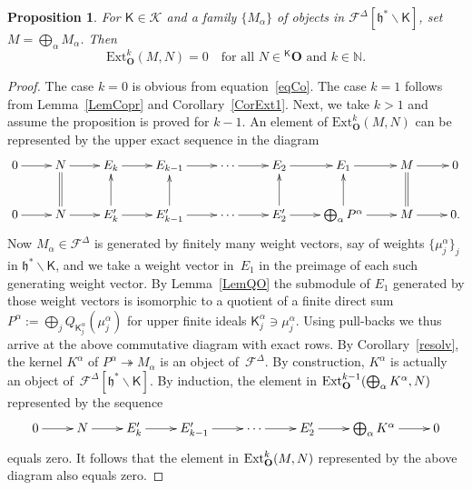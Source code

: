 \documentclass[11pt]{amsart}
\newcommand{\cK}{\mathcal{K}}
\newcommand{\KKK}{\mathsf{K}}
\newcommand{\cF}{{\mathcal{F}}}
\newcommand{\tto}{\twoheadrightarrow}
\newcommand{\bO}{\mathbf{O}}
\newcommand{\Hom}{\mathrm{Hom}}
\newcommand{\Ext}{\mathrm{Ext}}
\newcommand{\fg}{\mathfrak{g}}
\newcommand{\fh}{\mathfrak{h}}
\newcommand{\mN}{\mathbb{N}}
\numberwithin{equation}{section}
\theoremstyle{plain}
\newtheorem{prop}[subsubsection]{Proposition}
\theoremstyle{remark}
\theoremstyle{remark}
\theoremstyle{construction}
\begin{document}
\begin{prop}\label{PropSumD}
For $\KKK\in\cK$ and a family $\{M_\alpha\}$ of objects in $\cF^\Delta[\fh^\ast\backslash \KKK]$, set $M=\bigoplus_\alpha M_\alpha$. {Then}
$$\Ext^k_{\bO}(M,N)=0\quad\mbox{for all $N\in{}^{\KKK}\bO$ and~$k\in\mN$.}$$
\end{prop}
\begin{proof}
The case $k=0$ is obvious {from} equation~\eqref{eqCo}. The case $k=1$ follows from Lemma~\ref{LemCopr} and Corollary~\ref{CorExt1}. {Next,} we take $k>1$ and assume the proposition is proved for $k-1$. An element {of} $\Ext^k_{\bO}(M,N)$ can be represented by the upper exact sequence in the diagram
$$\xymatrix{
0\ar[r]& N\ar@{=}[d]\ar[r]& E_k\ar[r]& E_{k-1}\ar[r]&\cdots\ar[r]& E_2\ar[r]& E_1\ar[r]& M\ar[r]\ar@{=}[d]& 0\\
0\ar[r]& N\ar[r]& E_k'\ar[u]\ar[r]& E_{k-1}'\ar[u]\ar[r]&\cdots\ar[r]& E_2'\ar[u]\ar[r]& \bigoplus_\alpha P^\alpha\ar[r]\ar[u]& M\ar[r]& 0.
}$$
Now $M_\alpha\in \cF^\Delta$ is generated by finitely many weight vectors, say of weights $\{\mu^\alpha_j\}_j$ in $\fh^\ast\backslash\KKK$, and we take a weight vector in~$E_1$ in the preimage of each such generating weight vector. By Lemma~\ref{LemQO} the submodule of $E_1$ generated by those weight vectors is {isomorphic to} a quotient of a finite direct sum $P^\alpha:=\bigoplus_j Q_{\KKK^\alpha_j}(\mu^\alpha_j)$ for upper finite ideals $\KKK^\alpha_j\ni \mu^\alpha_j$. Using pull-backs we thus arrive at the above commutative diagram with exact rows. By Corollary~\ref{resolv}, the kernel $K^\alpha$ of $P^\alpha\tto M_\alpha$ is {an object of}~$\cF^\Delta$. By construction, $K^\alpha$ is {actually an object of}~$\cF^\Delta[\fh^\ast\backslash \KKK]$. By induction, the 
 {element in $\operatorname{Ext}^{k-1}_{{\bf O}}(\bigoplus_\alpha K^\alpha, N)$ represented by the sequence}
$$\xymatrix{
0\ar[r]& N\ar[r]& E_k'\ar[r]& E_{k-1}'\ar[r]&\cdots\ar[r]& E_2'\ar[r]& \bigoplus_\alpha K^\alpha \ar[r]& 0
}$$
{equals} zero. It follows that the {element in $\operatorname{Ext}^k_{{\bf O}}(M,N)$ represented by the above diagram also equals zero}.
\end{proof}


\end{document}
